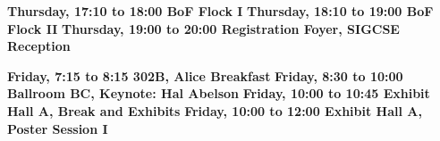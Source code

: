 \noindent
{\sffamily\bfseries Thursday, 17:10 to 18:00  BoF Flock I}\newline\noindent 
{\sffamily\bfseries Thursday, 18:10 to 19:00 BoF Flock II}\newline\noindent
{\sffamily\bfseries Thursday, 19:00 to 20:00 Registration Foyer, SIGCSE Reception}\newline\noindent



%
%
\noindent
{\sffamily\bfseries Friday, 7:15 to 8:15 302B, Alice Breakfast}\newline\noindent
{\sffamily\bfseries Friday, 8:30 to 10:00 Ballroom BC, Keynote: Hal Abelson}\newline\noindent
{\sffamily\bfseries Friday, 10:00 to 10:45 Exhibit Hall A, Break and Exhibits}\newline\noindent
{\sffamily\bfseries Friday, 10:00 to 12:00 Exhibit Hall A, Poster Session I}\newline\noindent
